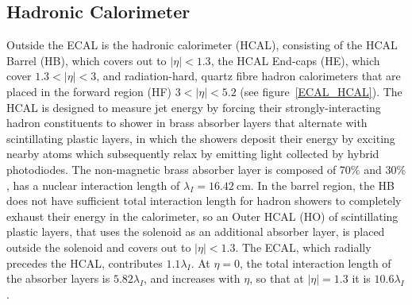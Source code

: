 \subsection{Hadronic Calorimeter}
Outside the ECAL is the hadronic calorimeter (HCAL), consisting of the HCAL Barrel (HB), which covers out to $\vert \eta \vert < 1.3$, the HCAL End-caps (HE), which cover $1.3 < \vert \eta \vert < 3$, and radiation-hard, quartz fibre hadron calorimeters that are placed in the forward region (HF) $3 < \vert \eta \vert < 5.2$ (see figure~\ref{ECAL_HCAL}).
The HCAL is designed to measure jet energy by forcing their strongly-interacting hadron constituents to shower in brass absorber layers that alternate with scintillating plastic layers, in which the showers deposit their energy by exciting nearby atoms which subsequently relax by emitting light collected by hybrid photodiodes.
The non-magnetic brass absorber layer is composed of 70\%  and 30\% , has a nuclear interaction length of $\lambda_I = \SI{16.42}{\cm}$.
In the barrel region, the HB does not have sufficient total interaction length for hadron showers to completely exhaust their energy in the calorimeter, so an Outer HCAL (HO) of scintillating plastic layers, that uses the solenoid as an additional absorber layer, is placed outside the solenoid and covers out to $\vert \eta \vert < 1.3$.
The ECAL, which radially precedes the HCAL, contributes $1.1\lambda_I$.
At $\eta = 0$, the total interaction length of the absorber layers is $5.82\lambda_I$, and increases with $\eta$, so that at $\vert \eta \vert = 1.3$ it is $10.6\lambda_I$.

